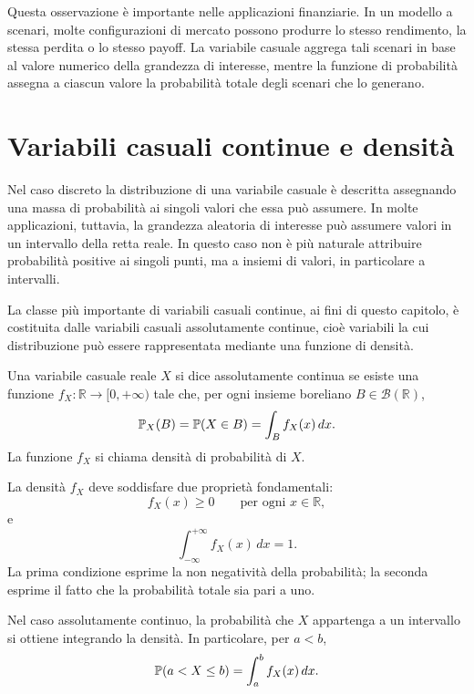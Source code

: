 Questa osservazione \`{e} importante nelle applicazioni finanziarie. In un modello
a scenari, molte configurazioni di mercato possono produrre lo stesso rendimento,
la stessa perdita o lo stesso payoff. La variabile casuale aggrega tali scenari in
base al valore numerico della grandezza di interesse, mentre la funzione di probabilit\`{a}
assegna a ciascun valore la probabilit\`{a} totale degli scenari che lo generano.


\section{Variabili casuali continue e densit\`{a}}
\label{sec:cap2-vc-continue-densita}

Nel caso discreto la distribuzione di una variabile casuale \`{e} descritta
assegnando una massa di probabilit\`{a} ai singoli valori che essa pu\`{o}
assumere. In molte applicazioni, tuttavia, la grandezza aleatoria di interesse
pu\`{o} assumere valori in un intervallo della retta reale. In questo caso non
\`{e} pi\`{u} naturale attribuire probabilit\`{a} positive ai singoli punti, ma a
insiemi di valori, in particolare a intervalli.

La classe pi\`{u} importante di variabili casuali continue, ai fini di questo
capitolo, \`{e} costituita dalle variabili casuali assolutamente continue, cio\`{e}
variabili la cui distribuzione pu\`{o} essere rappresentata mediante una funzione
di densit\`{a}.

\begin{definition}
Una variabile casuale reale $X$ si dice assolutamente continua se esiste una
funzione $f_X:\mathbb{R}\to[0,+\infty)$ tale che, per ogni insieme boreliano
$B\in\mathcal{B}(\mathbb{R})$,
\[
\mathbb{P}_X(B)
=
\mathbb{P}(X\in B)
=
\int_B f_X(x)\,dx.
\]
La funzione $f_X$ si chiama densit\`{a} di probabilit\`{a} di $X$.
\end{definition}

La densit\`{a} $f_X$ deve soddisfare due propriet\`{a} fondamentali:
\[
f_X(x)\geq 0
\qquad
\mbox{per ogni }x\in\mathbb{R},
\]
e
\[
\int_{-\infty}^{+\infty} f_X(x)\,dx=1.
\]
La prima condizione esprime la non negativit\`{a} della probabilit\`{a}; la
seconda esprime il fatto che la probabilit\`{a} totale sia pari a uno.

Nel caso assolutamente continuo, la probabilit\`{a} che $X$ appartenga a un
intervallo si ottiene integrando la densit\`{a}. In particolare, per $a<b$,
\[
\mathbb{P}(a<X\leq b)
=
\int_a^b f_X(x)\,dx.
\]

